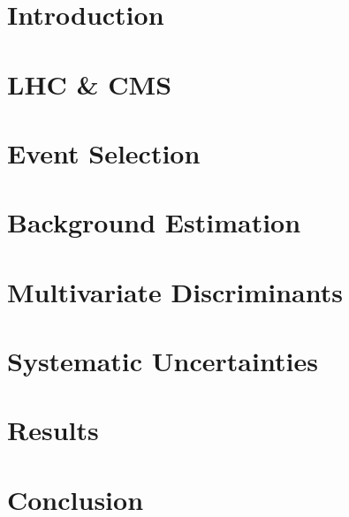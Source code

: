 \documentclass[compress,10pt,dvipsnames]{Presentation}
\begin{document}
\section[Intro.]{Introduction}
\label{sec:intro}


\section[CERN]{LHC \& CMS}
\label{sec:experiment}


\section[Evt. Sel.]{Event Selection}
\label{sec:event_selection}


\section[Bkg. Est.]{Background Estimation}
\label{sec:background_estimation}


\section[MVA]{Multivariate Discriminants}
\label{sec:mem}

\label{sec:signal_extraction}


\section[Sys.]{Systematic Uncertainties}
\label{sec:systematics}


\section[Res.]{Results}
\label{sec:limits}


\section[Conc.]{Conclusion}
\label{sec:conclusion}


%
\end{document}
